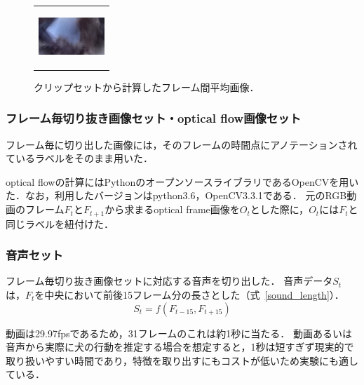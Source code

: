 \begin{enumerate}
\begin{end}
\begin{figure}[H]
\begin{center}
\begin{tabular}{c}
      \begin{minipage}{0.18\hsize}
        \begin{center}
          \includegraphics[clip, width=2.5cm]{./Figures/resque_mean5.eps}
          \hspace{0.2cm} { }
        \end{center}
      \end{minipage}
    \end{tabular}
    \caption{クリップセットから計算したフレーム間平均画像．}
    \label{resque_mean}
  \end{center}
\end{figure}

\subsubsection{フレーム毎切り抜き画像セット・optical flow画像セット}
フレーム毎に切り出した画像には，そのフレームの時間点にアノテーションされているラベルをそのまま用いた．

optical flowの計算にはPythonのオープンソースライブラリであるOpenCVを用いた．なお，利用したバージョンはpython3.6，OpenCV3.3.1である．
元のRGB動画のフレーム$F_t$と$F_{t+1}$から求まるoptical frame画像を$O_t$とした際に，$O_t$には$F_t$と同じラベルを紐付けた．


\subsubsection{音声セット}
フレーム毎切り抜き画像セットに対応する音声を切り出した．
音声データ$S_t$は，$F_t$を中央において前後15フレーム分の長さとした（式~\ref{sound_length}）．
\begin{equation}
\label{sound_length}
S_t = f(F_{t-15}, F_{t+15})
\end{equation}

動画は29.97fpsであるため，31フレームのこれは約1秒に当たる．
動画あるいは音声から実際に犬の行動を推定する場合を想定すると，1秒は短すぎず現実的で取り扱いやすい時間であり，特徴を取り出すにもコストが低いため実験にも適している．



\end{end}
\end{enumerate}

